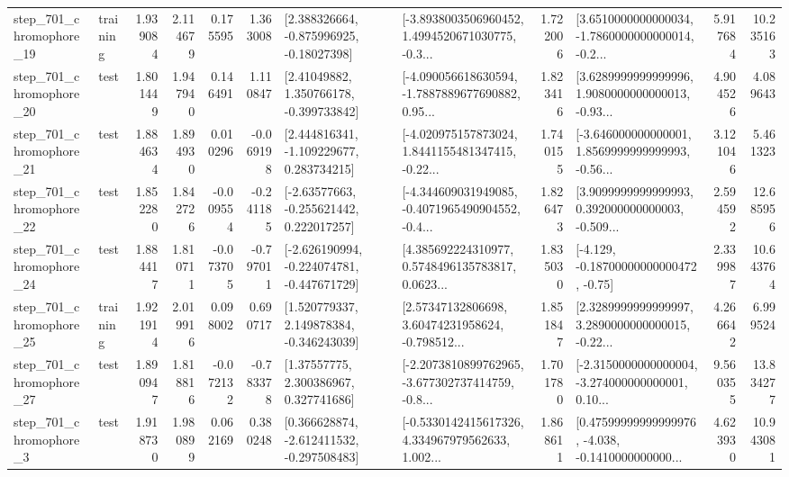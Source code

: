 \begin{tabular}{llrrrrllrlrr}
  step\_701\_chromophore\_19 &  training &      1.939084 &    2.114679 &      0.175595 &  1.363008 &    [2.388326664, -0.875996925, -0.18027398] &  [-3.8938003506960452, 1.4994520671030775, -0.3... &       1.722006 &  [3.6510000000000034, -1.7860000000000014, -0.2... &            5.917684 &         10.235163 \\
  step\_701\_chromophore\_20 &      test &      1.801449 &    1.947940 &      0.146491 &  1.110847 &     [2.41049882, 1.350766178, -0.399733842] &  [-4.090056618630594, -1.7887889677690882, 0.95... &       1.823416 &  [3.6289999999999996, 1.9080000000000013, -0.93... &            4.904526 &          4.089643 \\
  step\_701\_chromophore\_21 &      test &      1.884634 &    1.894930 &      0.010296 & -0.069198 &    [2.444816341, -1.109229677, 0.283734215] &  [-4.020975157873024, 1.8441155481347415, -0.22... &       1.740155 &  [-3.646000000000001, 1.8569999999999993, -0.56... &            3.121046 &          5.461323 \\
  step\_701\_chromophore\_22 &      test &      1.852280 &    1.842726 &     -0.009554 & -0.241185 &    [-2.63577663, -0.255621442, 0.222017257] &  [-4.344609031949085, -0.4071965490904552, -0.4... &       1.826473 &  [3.9099999999999993, 0.392000000000003, -0.509... &            2.594592 &         12.685956 \\
  step\_701\_chromophore\_24 &      test &      1.884417 &    1.810711 &     -0.073705 & -0.797011 &  [-2.626190994, -0.224074781, -0.447671729] &  [4.385692224310977, 0.5748496135783817, 0.0623... &       1.835030 &              [-4.129, -0.18700000000000472, -0.75] &            2.339987 &         10.643764 \\
  step\_701\_chromophore\_25 &  training &      1.921914 &    2.019916 &      0.098002 &  0.690717 &    [1.520779337, 2.149878384, -0.346243039] &  [2.57347132806698, 3.60474231958624, -0.798512... &       1.851847 &  [2.3289999999999997, 3.2890000000000015, -0.22... &            4.266642 &          6.999524 \\
  step\_701\_chromophore\_27 &      test &      1.890947 &    1.818816 &     -0.072132 & -0.783378 &      [1.37557775, 2.300386967, 0.327741686] &  [-2.2073810899762965, -3.677302737414759, -0.8... &       1.701780 &  [-2.3150000000000004, -3.274000000000001, 0.10... &            9.560355 &         13.834277 \\
   step\_701\_chromophore\_3 &      test &      1.918730 &    1.980899 &      0.062169 &  0.380248 &   [0.366628874, -2.612411532, -0.297508483] &  [-0.5330142415617326, 4.334967979562633, 1.002... &       1.868611 &  [0.47599999999999976, -4.038, -0.1410000000000... &            4.623930 &         10.943081 \\

\end{tabular}
